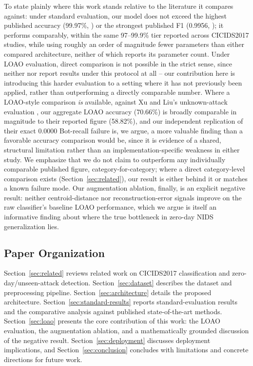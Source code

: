 \documentclass[11pt]{article}
\begin{document}
To state plainly where this work stands relative to the literature it compares against: under
standard evaluation, our model does not exceed the highest published accuracy (99.97\%,
\cite{kumar2023}) or the strongest published F1 (0.9956, \cite{afraji2025}); it performs comparably,
within the same 97--99.9\% tier reported across CICIDS2017 studies, while using roughly an order of
magnitude fewer parameters than either compared architecture, neither of which reports its
parameter count. Under LOAO evaluation, direct comparison is not possible in the strict sense, since
neither \cite{afraji2025} nor \cite{kumar2023} report results under this protocol at all -- our
contribution here is introducing this harder evaluation to a setting where it has not previously
been applied, rather than outperforming a directly comparable number. Where a LOAO-style comparison
\emph{is} available, against Xu and Liu's unknown-attack evaluation \cite{xu2025}, our aggregate
LOAO accuracy (70.66\%) is broadly comparable in magnitude to their reported figure (58.82\%), and
our independent replication of their exact 0.0000 Bot-recall failure is, we argue, a more valuable
finding than a favorable accuracy comparison would be, since it is evidence of a shared, structural
limitation rather than an implementation-specific weakness in either study. We emphasize that we do
not claim to outperform any individually comparable published figure, category-for-category; where
a direct category-level comparison exists (Section~\ref{sec:related}), our result is either behind
it or matches a known failure mode. Our augmentation ablation, finally, is an explicit negative
result: neither centroid-distance nor reconstruction-error signals improve on the raw classifier's
baseline LOAO performance, which we argue is itself an informative finding about where the true
bottleneck in zero-day NIDS generalization lies.

\subsection{Paper Organization}

Section~\ref{sec:related} reviews related work on CICIDS2017 classification and
zero-day/unseen-attack detection. Section~\ref{sec:dataset} describes the dataset and preprocessing
pipeline. Section~\ref{sec:architecture} details the proposed architecture. Section~\ref{sec:standard-results}
reports standard-evaluation results and the comparative analysis against published state-of-the-art
methods. Section~\ref{sec:loao} presents the core contribution of this work: the LOAO evaluation,
the augmentation ablation, and a mathematically grounded discussion of the negative result.
Section~\ref{sec:deployment} discusses deployment implications, and Section~\ref{sec:conclusion}
concludes with limitations and concrete directions for future work.
\end{document}
